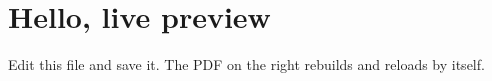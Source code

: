 \documentclass{article}
\begin{document}
\section*{Hello, live preview}
Edit this file and save it. The PDF on the right rebuilds and reloads by itself.
\end{document}
